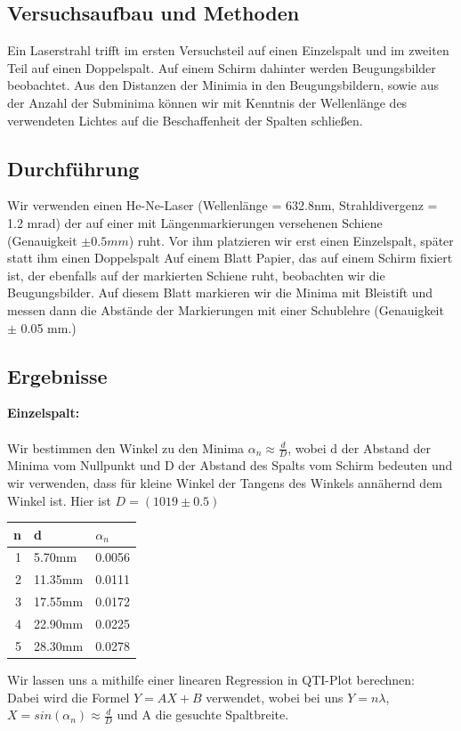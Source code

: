 \documentclass{article}
\begin{document}
\subsection{Versuchsaufbau und Methoden}
 Ein Laserstrahl trifft im ersten Versuchsteil auf einen Einzelspalt und im zweiten Teil auf einen Doppelspalt. Auf einem Schirm dahinter werden Beugungsbilder beobachtet. Aus den Distanzen der Minimia in den Beugungsbildern, sowie aus der Anzahl der Subminima können wir mit Kenntnis der Wellenlänge des verwendeten Lichtes auf die Beschaffenheit der Spalten schließen. 
\subsection{Durchführung}
Wir verwenden einen He-Ne-Laser (Wellenlänge = 632.8nm, Strahldivergenz = 1.2 mrad) der auf einer mit Längenmarkierungen versehenen Schiene (Genauigkeit $\pm 0.5mm$) ruht. Vor ihm platzieren wir erst einen Einzelspalt, später statt ihm einen Doppelspalt Auf einem Blatt Papier, das auf einem Schirm fixiert ist, der ebenfalls auf der markierten Schiene ruht, beobachten wir die Beugungsbilder. Auf diesem Blatt markieren wir die Minima mit Bleistift und messen dann die Abstände der Markierungen mit einer Schublehre (Genauigkeit $\pm$ 0.05 mm.) 
\subsection{Ergebnisse}
\textbf{Einzelspalt:}\\
\\
Wir bestimmen den Winkel zu den Minima $\alpha_n \approx \frac{d}{D}$, wobei d der Abstand der Minima vom Nullpunkt und D der Abstand des Spalts vom Schirm bedeuten und wir verwenden, dass für kleine Winkel der Tangens des Winkels annähernd dem Winkel ist. Hier ist $D=(1019 \pm 0.5)$\\

\begin{tabular}{|r|l|l|}
\hline
n & d & $\alpha_n$\\
\hline
1 & 5.70mm & 0.0056\\
2 & 11.35mm & 0.0111\\
3 & 17.55mm & 0.0172\\
4 & 22.90mm & 0.0225\\
5 & 28.30mm & 0.0278\\
\hline
\end{tabular}
\vspace{0.8cm}

Wir lassen uns a mithilfe einer linearen Regression in QTI-Plot berechnen:\\
Dabei wird die Formel $Y=AX+B$ verwendet, wobei bei uns $Y=n\lambda$, $X=sin(\alpha_n)\approx\frac{d}{D}$ und A die gesuchte Spaltbreite.\\
\end{document}
